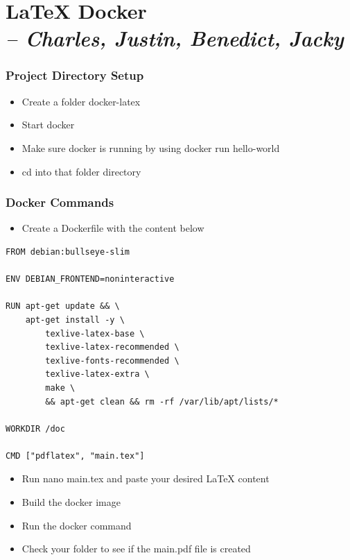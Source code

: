 \chapter[LaTeX Docker]{LaTeX Docker\\\small{\textit{-- Charles, Justin, Benedict, Jacky}}}
\label{Chapter::LaTeX Docker}



\subsection{Project Directory Setup}
\begin{itemize}
    \item Create a folder docker-latex 
    \item Start docker
    \item Make sure docker is running by using docker run hello-world 
    \item cd into that folder directory 
\end{itemize}

\subsection{Docker Commands}
\begin{itemize}
    \item Create a Dockerfile with the content below
\end{itemize}

\begin{verbatim}
FROM debian:bullseye-slim

ENV DEBIAN_FRONTEND=noninteractive

RUN apt-get update && \
    apt-get install -y \
        texlive-latex-base \
        texlive-latex-recommended \
        texlive-fonts-recommended \
        texlive-latex-extra \
        make \
        && apt-get clean && rm -rf /var/lib/apt/lists/*

WORKDIR /doc

CMD ["pdflatex", "main.tex"]
\end{verbatim}
\begin{itemize}
    \item Run nano main.tex and paste your desired LaTeX content 
    \item Build the docker image 
    \item Run the docker command 
    \item Check your folder to see if the main.pdf file is created 
\end{itemize}


